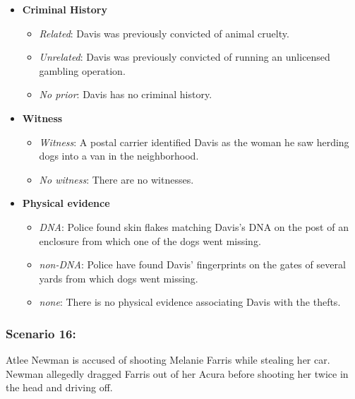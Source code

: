 \documentclass[
]{article}
\providecommand{\tightlist}{%
  \setlength{\itemsep}{0pt}\setlength{\parskip}{0pt}}
\begin{document}
\begin{itemize}
\tightlist
\item
  \textbf{Criminal History}

  \begin{itemize}
  \tightlist
  \item
    \emph{Related}: Davis was previously convicted of animal cruelty.
  \item
    \emph{Unrelated}: Davis was previously convicted of running an
    unlicensed gambling operation.
  \item
    \emph{No prior}: Davis has no criminal history.
  \end{itemize}
\item
  \textbf{Witness}

  \begin{itemize}
  \tightlist
  \item
    \emph{Witness}: A postal carrier identified Davis as the woman he
    saw herding dogs into a van in the neighborhood.
  \item
    \emph{No witness}: There are no witnesses.
  \end{itemize}
\item
  \textbf{Physical evidence}

  \begin{itemize}
  \tightlist
  \item
    \emph{DNA}: Police found skin flakes matching Davis's DNA on the
    post of an enclosure from which one of the dogs went missing.
  \item
    \emph{non-DNA}: Police have found Davis' fingerprints on the gates
    of several yards from which dogs went missing.
  \item
    \emph{none}: There is no physical evidence associating Davis with
    the thefts.
  \end{itemize}
\end{itemize}

\hypertarget{scenario-16}{%
\subsubsection{Scenario 16:}\label{scenario-16}}

Atlee Newman is accused of shooting Melanie Farris while stealing her
car. Newman allegedly dragged Farris out of her Acura before shooting
her twice in the head and driving off.
\end{document}
